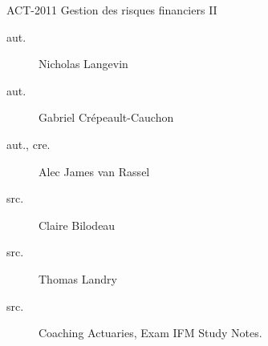 \begin{contrib}{ACT-2011\: Gestion des risques financiers II}
\begin{description}
	\item[aut.] Nicholas Langevin
	\item[aut.] Gabriel Crépeault-Cauchon 
	\item[aut., cre.] Alec James van Rassel
	\item[src.] Claire Bilodeau
	\item[src.] Thomas Landry	
	\item[src.]	Coaching Actuaries, Exam IFM Study Notes.
\end{description}
\end{contrib}
